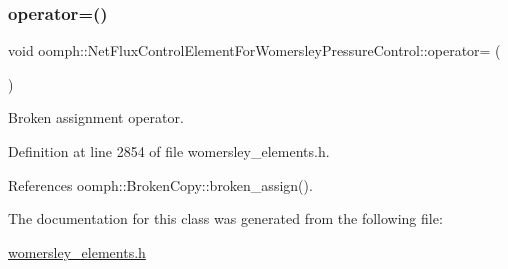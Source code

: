 \subsubsection{\texorpdfstring{operator=()}{operator=()}}
{\footnotesize\ttfamily void oomph\+::\+Net\+Flux\+Control\+Element\+For\+Womersley\+Pressure\+Control\+::operator= (\begin{DoxyParamCaption}\item[{const \hyperlink{classoomph_1_1NetFluxControlElementForWomersleyPressureControl}{Net\+Flux\+Control\+Element\+For\+Womersley\+Pressure\+Control} \&}]{ }\end{DoxyParamCaption})\hspace{0.3cm}{\ttfamily [inline]}}



Broken assignment operator. 



Definition at line 2854 of file womersley\+\_\+elements.\+h.



References oomph\+::\+Broken\+Copy\+::broken\+\_\+assign().



The documentation for this class was generated from the following file\+:\begin{DoxyCompactItemize}
\item 
\hyperlink{womersley__elements_8h}{womersley\+\_\+elements.\+h}\end{DoxyCompactItemize}
